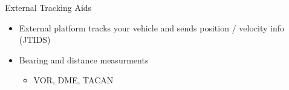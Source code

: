 \begin{frame}
External Tracking Aids
 \begin{itemize}
 \item External platform tracks your vehicle and sends position / velocity info (JTIDS) 
 \item Bearing and distance measurments
	\begin{itemize}
		\item VOR, DME, TACAN
	\end{itemize}
\end{itemize}
\end{frame}
